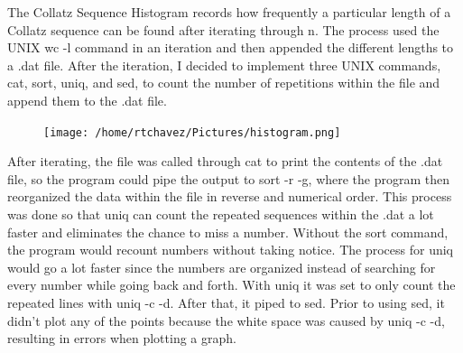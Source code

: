 \documentclass[11pt]{article} %
\begin{document}
\begin{flushleft}

The Collatz Sequence Histogram records how frequently a particular length of a Collatz sequence 
can be found after iterating through n. The process used the UNIX wc -l command in an iteration 
and then appended the different lengths to a .dat file. After the iteration, I decided to 
implement three UNIX commands, cat, sort, uniq, and sed, to count the number of repetitions 
within the file and append them to the .dat file.
 
\begin{figure}[htp]
\centering
\texttt{[image: /home/rtchavez/Pictures/histogram.png]}
\caption{}
\label{}
\end{figure}

After iterating, the file was called through 
cat to print the contents of the .dat file, so the program could pipe the output to sort -r -g,
 where the program then reorganized the data within the file in reverse and numerical order. This 
process was done so that uniq can count the repeated sequences within the .dat a lot faster and 
eliminates the chance to miss a number. Without the sort command, the program would recount numbers 
without taking notice.
The process for uniq would go a lot faster since the numbers are organized 
instead of searching for every number while going back and forth. With uniq it was set to only 
count the repeated lines with uniq -c -d. After that, it piped to sed. Prior to using sed, it didn't 
plot any of the points because the white space was caused by uniq -c -d, resulting in errors when
 plotting a graph.
\end{flushleft}
\end{document}
